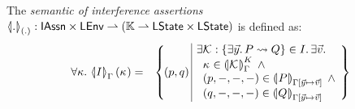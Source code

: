 \begin{definition}\label{def:interferenceSemantics}
The \emph{semantic of interference assertions}
%
$
	\semI[(.)]{.} : \IAssertions \times \LEnv \rightharpoonup (\Caps \rightharpoonup  \LStates \times \LStates )
$
%
is defined as:
%
\[
\begin{array}{r l}
	\for{\kappa} \semI[\lenv]{I}(\ca{}) =
	 	&
	 	\left\{
		\begin{array}{l | r}
			
			\hspace*{-0.2cm}(p, q)\hspace*{-0.1cm} & 
			\hspace*{-0.2cm}
			\begin{array}{l}
				\exsts{\interAss{\capAss{}}{\vec{y}}{P}{Q} \in I} \exsts{\vec{v}}\\
	
				\hspace*{0.2cm}
				\ca{} \in \semK[\lenv]{\capAss{}} \;\land\\
				
				\hspace*{0.2cm}
				(p, -, -, -) \in \intermediateSem[\lenv\text{[} \vec{y} \mapsto \vec{v} \text{]}]{P} \;\land\\
				

				
				\hspace*{0.2cm}
				(q, -, -, -) \in \intermediateSem[\lenv\text{[} \vec{y} \mapsto \vec{v} \text{]}]{Q} 
				
			\end{array}
		\end{array}
	\hspace*{-0.2cm}
	\right\}

\end{array}
\]
%
\end{definition}
%
%
%
%
